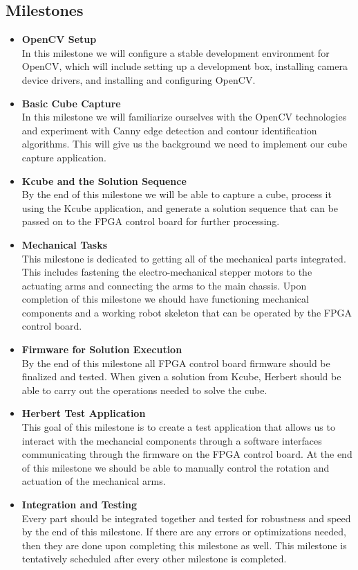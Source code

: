 \documentclass[final, letterpaper, 10 pt, conference, onecolumn]{IEEEtran}
\begin{document}
\subsection{Milestones}
\label{sec:Milestones}
\begin{itemize}
  \item {\bf OpenCV Setup} \hfill \\
  In this milestone we will configure a stable development environment for OpenCV, which will include setting up a development box, installing camera device drivers, and installing and configuring OpenCV.

  \item {\bf Basic Cube Capture} \hfill \\
  In this milestone we will familiarize ourselves with the OpenCV technologies and experiment with Canny edge detection and contour identification algorithms. This will give us the background we need to implement our cube capture application.
  \item {\bf Kcube and the Solution Sequence} \hfill \\
  By the end of this milestone we will be able to capture a cube, process it using the Kcube application, and generate a solution sequence that can be passed on to the FPGA control board for further processing.

  \item {\bf Mechanical Tasks} \hfill \\
  This milestone is dedicated to getting all of the mechanical parts integrated. This includes fastening the electro-mechanical stepper motors to the actuating arms and connecting the arms to the main chassis. Upon completion of this milestone we should have functioning mechanical components and a  working robot skeleton that can be operated by the FPGA control board.

  \item {\bf Firmware for Solution Execution} \hfill \\
  By the end of this milestone all FPGA control board firmware should be finalized and tested. When given a solution from Kcube, Herbert should be able to carry out the operations needed to solve the cube.

  \item {\bf Herbert Test Application} \hfill \\
  This goal of this milestone is to create a test application that allows us to interact with the mechancial components through a software interfaces communicating through the firmware on the FPGA control board. At the end of this milestone we should be able to manually control the rotation and actuation of the mechanical arms.

  \item {\bf Integration and Testing} \hfill \\
  Every part should be integrated together and tested for robustness and speed by the end of this milestone. If there are any errors or optimizations needed, then they are done upon completing this milestone as well. This milestone is tentatively scheduled after every other milestone is completed.
\end{itemize}
\end{document}

